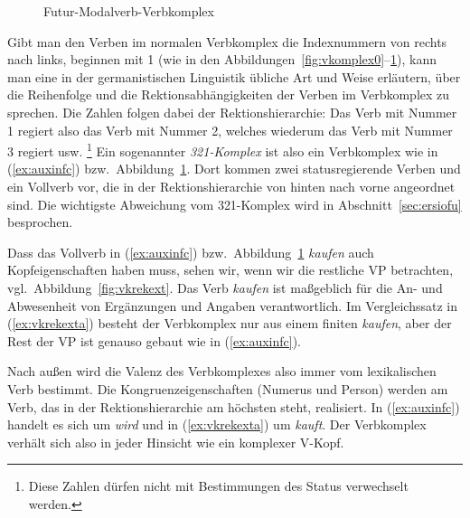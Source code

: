 \begin{figure}[!htbp]
  \centering
  \vspace{0.3cm}
  \caption{Futur-Modalverb-Verbkomplex}
  \label{fig:vkomplex3}
\end{figure}

Gibt man den Verben im normalen Verbkomplex die Indexnummern von rechts nach links, beginnen mit 1 (wie in den Abbildungen~\ref{fig:vkomplex0}--\ref{fig:vkomplex3}), kann man eine in der germanistischen Linguistik übliche Art und Weise erläutern, über die Reihenfolge und die Rektionsabhängigkeiten der Verben im Verbkomplex zu sprechen.
Die Zahlen folgen dabei der Rektionshierarchie:
Das Verb mit Nummer 1 regiert also das Verb mit Nummer 2, welches wiederum das Verb mit Nummer 3 regiert usw.%
\footnote{Diese Zahlen dürfen nicht mit Bestimmungen des Status verwechselt werden.}
Ein sogenannter \textit{321-Komplex} ist also ein Verbkomplex wie in (\ref{ex:auxinfc}) bzw.\ Abbildung~\ref{fig:vkomplex3}.
Dort kommen zwei statusregierende Verben und ein Vollverb vor, die in der Rektionshierarchie von hinten nach vorne angeordnet sind.
Die wichtigste Abweichung vom 321-Komplex wird in Abschnitt~\ref{sec:ersiofu} besprochen.

Dass das Vollverb in (\ref{ex:auxinfc}) bzw.\ Abbildung~\ref{fig:vkomplex3} \textit{kaufen} auch Kopfeigenschaften haben muss, sehen wir, wenn wir die restliche VP betrachten, vgl.\ Abbildung~\ref{fig:vkrekext}.
Das Verb \textit{kaufen} ist maßgeblich für die An- und Abwesenheit von Ergänzungen und Angaben verantwortlich.
Im Vergleichssatz in (\ref{ex:vkrekexta}) besteht der Verbkomplex nur aus einem finiten \textit{kaufen}, aber der Rest der VP ist genauso gebaut wie in (\ref{ex:auxinfc}).

\begin{exe}
\end{exe}

Nach außen wird die Valenz des Verbkomplexes also immer vom lexikalischen Verb bestimmt.
Die Kongru\-enz\-ei\-gen\-schaf\-ten (Numerus und Person) werden am Verb, das in der Rektionshierarchie am höchsten steht, realisiert.
In (\ref{ex:auxinfc}) handelt es sich um \textit{wird} und in (\ref{ex:vkrekexta}) um \textit{kauft}.
Der Verbkomplex verhält sich also in jeder Hinsicht wie ein komplexer V-Kopf.


